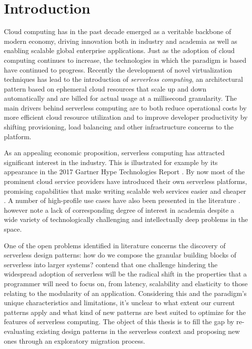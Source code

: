 \documentclass[utf8,english]{gradu3}
\begin{document}
\mainmatter

\chapter{Introduction}

Cloud computing has in the past decade emerged as a veritable backbone of modern economy, driving innovation both in industry and academia as well as enabling scalable global enterprise applications. Just as the adoption of cloud computing continues to increase, the technologies in which the paradigm is based have continued to progress. Recently the development of novel virtualization techniques has lead to the introduction of \textit{serverless computing}, an architectural pattern based on ephemeral cloud resources that scale up and down automatically and are billed for actual usage at a millisecond granularity. The main drivers behind serverless computing are to both reduce operational costs by more efficient cloud resource utilization and to improve developer productivity by shifting provisioning, load balancing and other infrastructure concerns to the platform. \parencite{buyya2017manifesto}

As an appealing economic proposition, serverless computing has attracted significant interest in the industry. This is illustrated for example by its appearance in the 2017 Gartner Hype Technologies Report \parencite{walker17gartnerHype}. By now most of the prominent cloud service providers have introduced their own serverless platforms, promising capabilities that make writing scalable web services easier and cheaper \parencite[e.g.][]{awslambda0218, google18cloudFunctions, ibm18cloudFunctions, microsoft18azureFunctions}. A number of high-profile use cases have also been presented in the literature \parencite{cncf18serverlessWG}. \textcite{baldini17currentTrends} however note a lack of corresponding degree of interest in academia despite a wide variety of technologically challenging and intellectually deep problems in the space.

One of the open problems identified in literature concerns the discovery of serverless design patterns: how do we compose the granular building blocks of serverless into larger systems? \parencite{baldini17currentTrends} \textcite{varghese18next} contend that one challenge hindering the widespread adoption of serverless will be the radical shift in the properties that a programmer will need to focus on, from latency, scalability and elasticity to those relating to the modularity of an application. Considering this and the paradigm's unique characteristics and limitations, it's unclear to what extent our current patterns apply and what kind of new patterns are best suited to optimize for the features of serverless computing. The object of this thesis is to fill the gap by re-evaluating existing design patterns in the serverless context and proposing new ones through an exploratory migration process.
\end{document}
